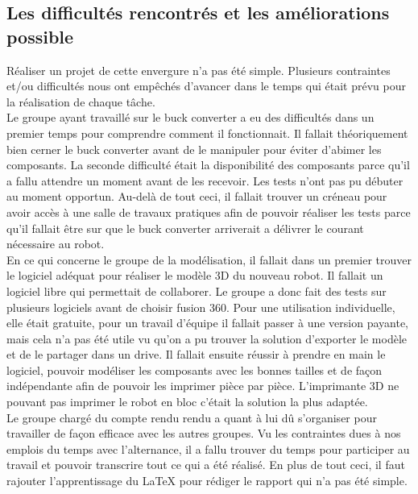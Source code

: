 \documentclass{PackagerQualityN}
\begin{document}
\subsection{Les difficultés rencontrés et les améliorations possible}

Réaliser un projet de cette envergure n’a pas été simple. Plusieurs contraintes et/ou difficultés nous ont empêchés d’avancer dans le temps qui était prévu pour la réalisation de chaque tâche.\\

Le groupe ayant travaillé sur le buck converter a eu des difficultés dans un premier temps pour comprendre comment il fonctionnait. Il fallait théoriquement bien cerner le buck converter avant de le manipuler pour éviter d’abimer les composants. 
La seconde difficulté était la disponibilité des composants parce qu’il a fallu attendre un moment avant de les recevoir. Les tests n’ont pas pu débuter au moment opportun.
Au-delà de tout ceci, il fallait trouver un créneau pour avoir accès à une salle de travaux pratiques afin de pouvoir réaliser les tests parce qu’il fallait être sur que le buck converter arriverait a délivrer le courant nécessaire au robot.\\

En ce qui concerne le groupe de la modélisation, il fallait dans un premier trouver le logiciel adéquat pour réaliser le modèle 3D du nouveau robot. Il fallait un logiciel libre qui permettait de collaborer. Le groupe a donc fait des tests sur plusieurs logiciels avant de choisir fusion 360. Pour une utilisation individuelle, elle était gratuite, pour un travail d'équipe il fallait passer à une version payante, mais cela n'a pas été utile vu qu'on a pu trouver la solution d'exporter le modèle et de le partager dans un drive.
Il fallait ensuite réussir à prendre en main le logiciel, pouvoir modéliser les composants avec les bonnes tailles et de façon indépendante afin de pouvoir les imprimer pièce par pièce. L'imprimante 3D ne pouvant pas imprimer le robot en bloc c'était la solution la plus adaptée.\\

Le groupe chargé du compte rendu rendu a quant à lui dû s'organiser pour travailler de façon efficace avec les autres groupes. Vu les contraintes dues à nos emplois du temps avec l'alternance, il a fallu trouver du temps pour participer au travail et pouvoir transcrire tout ce qui a été réalisé. En plus de tout ceci, il faut rajouter l'apprentissage du LaTeX pour rédiger le rapport qui n'a pas été simple.\\
\end{document}
